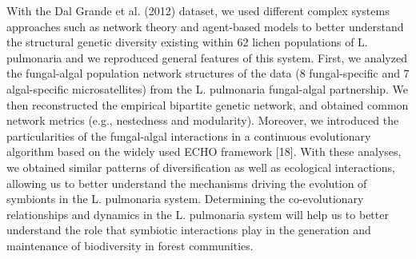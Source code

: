 With the Dal Grande et al. (2012) dataset, we used different complex systems approaches such as network theory and agent-based models to better understand the structural genetic diversity existing within 62 lichen populations of L. pulmonaria and we reproduced general features of this system. First, we analyzed the fungal-algal population network structures of the data (8 fungal-specific and 7 algal-specific microsatellites) from the L. pulmonaria fungal-algal partnership. We then reconstructed the empirical bipartite genetic network, and obtained common network metrics (e.g., nestedness and modularity). Moreover, we introduced the particularities of the fungal-algal interactions in a continuous evolutionary algorithm based on the widely used ECHO framework [18]. With these analyses, we obtained similar patterns of diversification as well as ecological interactions, allowing us to better understand the mechanisms driving the evolution of symbionts in the L. pulmonaria system. Determining the co-evolutionary relationships and dynamics in the L. pulmonaria system will help us to better understand the role that symbiotic interactions play in the generation and maintenance of biodiversity in forest communities.


